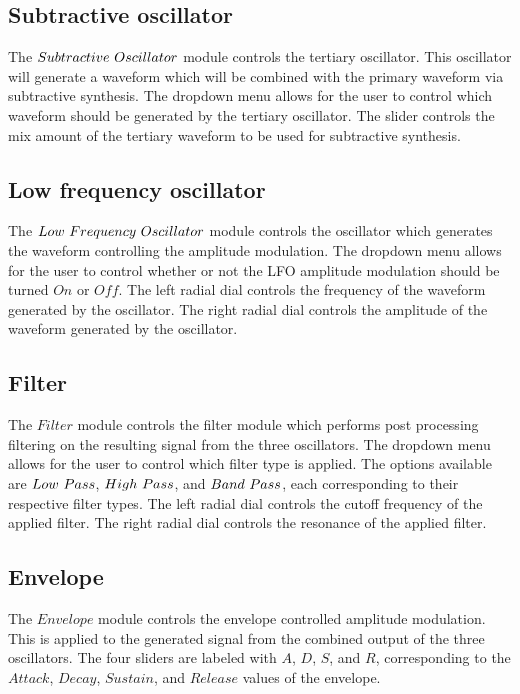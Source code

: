 \documentclass[a4paper,12pt]{report}
\begin{document}
\subsection{Subtractive oscillator}
\label{subsec:subosc}
The $Subtractive\ \-Oscillator$ module controls the tertiary oscillator. This oscillator will generate a waveform which will be combined with the primary waveform via subtractive synthesis. The dropdown menu allows for the user to control which waveform should be generated by the tertiary oscillator. The slider controls the mix amount of the tertiary waveform to be used for subtractive synthesis.

\subsection{Low frequency oscillator}
\label{subsec:lfo}
The $Low\ \-Frequency\ \-Oscillator$ module controls the oscillator which generates the waveform controlling the amplitude modulation. The dropdown menu allows for the user to control whether or not the LFO amplitude modulation should be turned $On$ or $Off$. The left radial dial controls the frequency of the waveform generated by the oscillator. The right radial dial controls the amplitude of the waveform generated by the oscillator.

\subsection{Filter}
\label{subsec:filter}
The $Filter$ module controls the filter module which performs post processing filtering on the resulting signal from the three oscillators. The dropdown menu allows for the user to control which filter type is applied. The options available are $Low\ \-Pass$, $High\ \-Pass$, and $Band\ \-Pass$, each corresponding to their respective filter types. The left radial dial controls the cutoff frequency of the applied filter. The right radial dial controls the resonance of the applied filter.

\subsection{Envelope}
\label{subsec:env}
The $Envelope$ module controls the envelope controlled amplitude modulation. This is applied to the generated signal from the combined output of the three oscillators. The four sliders are labeled with $A$, $D$, $S$, and $R$, corresponding to the $Attack$, $Decay$, $Sustain$, and $Release$ values of the envelope.
\end{document}
